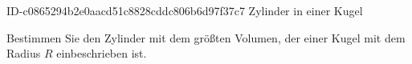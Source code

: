 \begin{exercise}
      {ID-c0865294b2e0aacd51c8828cddc806b6d97f37c7}
      {Zylinder in einer Kugel}
  \ifproblem\problem\par
    Bestimmen Sie den Zylinder mit dem größten Volumen, der einer Kugel
    mit dem Radius $R$ einbeschrieben ist.
  \fi
\end{exercise}
